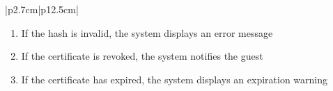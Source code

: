 \begin{table}[H]
\begin{tabular}{|p{2.7cm}|p{12.5cm}|}
\begin{minipage}[t]{\linewidth}
                                      \begin{enumerate}[topsep=0pt,itemsep=1pt,parsep=0pt,partopsep=0pt]
                                          \item If the hash is invalid, the system displays an error message
                                          \item If the certificate is revoked, the system notifies the guest
                                          \item If the certificate has expired, the system displays an expiration warning
                                      \end{enumerate}
                                  \end{minipage} \\
        \hline
    \end{tabular}
    \label{tab:guest-verify-cert}
\end{table}
